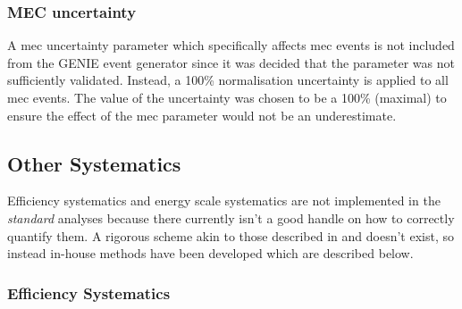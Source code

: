 \newpage
\subsubsection*{MEC uncertainty}\label{sec:MEC_uncertainty}
A \gls{mec} uncertainty parameter which specifically affects \gls{mec} events is not included from the GENIE event generator since it was decided that the parameter was not sufficiently validated. Instead, a 100\% normalisation uncertainty is applied to all \gls{mec} events. The value of the uncertainty was chosen to be a 100\% (maximal) to ensure the effect of the \gls{mec} parameter would not be an underestimate. 



\clearpage
\subsection{Other Systematics}\label{sec:other_syst}

Efficiency systematics and energy scale systematics are not implemented in the \textit{standard} analyses because there currently isn't a good handle on how to correctly quantify them. A rigorous scheme akin to those described in  and  doesn't exist, so instead in-house methods have been developed which are described below.

\subsubsection*{Efficiency Systematics}\label{sec:efficiency_syst}

